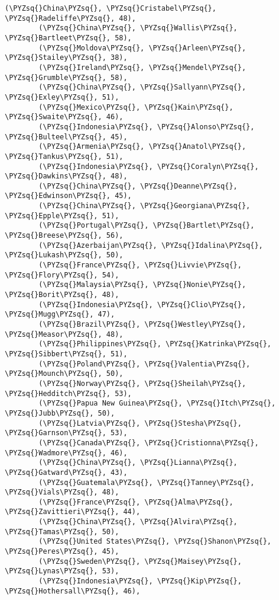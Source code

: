 \documentclass[11pt]{article}
\def\PYZsq{\textquotesingle}%
\def\PYZsq{\char`\'}
\begin{document}
\begin{Verbatim}[commandchars=\\\{\}]
        (\PYZsq{}China\PYZsq{}, \PYZsq{}Cristabel\PYZsq{}, \PYZsq{}Radeliffe\PYZsq{}, 48),
        (\PYZsq{}China\PYZsq{}, \PYZsq{}Wallis\PYZsq{}, \PYZsq{}Bartleet\PYZsq{}, 58),
        (\PYZsq{}Moldova\PYZsq{}, \PYZsq{}Arleen\PYZsq{}, \PYZsq{}Stailey\PYZsq{}, 38),
        (\PYZsq{}Ireland\PYZsq{}, \PYZsq{}Mendel\PYZsq{}, \PYZsq{}Grumble\PYZsq{}, 58),
        (\PYZsq{}China\PYZsq{}, \PYZsq{}Sallyann\PYZsq{}, \PYZsq{}Exley\PYZsq{}, 51),
        (\PYZsq{}Mexico\PYZsq{}, \PYZsq{}Kain\PYZsq{}, \PYZsq{}Swaite\PYZsq{}, 46),
        (\PYZsq{}Indonesia\PYZsq{}, \PYZsq{}Alonso\PYZsq{}, \PYZsq{}Bulteel\PYZsq{}, 45),
        (\PYZsq{}Armenia\PYZsq{}, \PYZsq{}Anatol\PYZsq{}, \PYZsq{}Tankus\PYZsq{}, 51),
        (\PYZsq{}Indonesia\PYZsq{}, \PYZsq{}Coralyn\PYZsq{}, \PYZsq{}Dawkins\PYZsq{}, 48),
        (\PYZsq{}China\PYZsq{}, \PYZsq{}Deanne\PYZsq{}, \PYZsq{}Edwinson\PYZsq{}, 45),
        (\PYZsq{}China\PYZsq{}, \PYZsq{}Georgiana\PYZsq{}, \PYZsq{}Epple\PYZsq{}, 51),
        (\PYZsq{}Portugal\PYZsq{}, \PYZsq{}Bartlet\PYZsq{}, \PYZsq{}Breese\PYZsq{}, 56),
        (\PYZsq{}Azerbaijan\PYZsq{}, \PYZsq{}Idalina\PYZsq{}, \PYZsq{}Lukash\PYZsq{}, 50),
        (\PYZsq{}France\PYZsq{}, \PYZsq{}Livvie\PYZsq{}, \PYZsq{}Flory\PYZsq{}, 54),
        (\PYZsq{}Malaysia\PYZsq{}, \PYZsq{}Nonie\PYZsq{}, \PYZsq{}Borit\PYZsq{}, 48),
        (\PYZsq{}Indonesia\PYZsq{}, \PYZsq{}Clio\PYZsq{}, \PYZsq{}Mugg\PYZsq{}, 47),
        (\PYZsq{}Brazil\PYZsq{}, \PYZsq{}Westley\PYZsq{}, \PYZsq{}Measor\PYZsq{}, 48),
        (\PYZsq{}Philippines\PYZsq{}, \PYZsq{}Katrinka\PYZsq{}, \PYZsq{}Sibbert\PYZsq{}, 51),
        (\PYZsq{}Poland\PYZsq{}, \PYZsq{}Valentia\PYZsq{}, \PYZsq{}Mounch\PYZsq{}, 50),
        (\PYZsq{}Norway\PYZsq{}, \PYZsq{}Sheilah\PYZsq{}, \PYZsq{}Hedditch\PYZsq{}, 53),
        (\PYZsq{}Papua New Guinea\PYZsq{}, \PYZsq{}Itch\PYZsq{}, \PYZsq{}Jubb\PYZsq{}, 50),
        (\PYZsq{}Latvia\PYZsq{}, \PYZsq{}Stesha\PYZsq{}, \PYZsq{}Garnson\PYZsq{}, 53),
        (\PYZsq{}Canada\PYZsq{}, \PYZsq{}Cristionna\PYZsq{}, \PYZsq{}Wadmore\PYZsq{}, 46),
        (\PYZsq{}China\PYZsq{}, \PYZsq{}Lianna\PYZsq{}, \PYZsq{}Gatward\PYZsq{}, 43),
        (\PYZsq{}Guatemala\PYZsq{}, \PYZsq{}Tanney\PYZsq{}, \PYZsq{}Vials\PYZsq{}, 48),
        (\PYZsq{}France\PYZsq{}, \PYZsq{}Alma\PYZsq{}, \PYZsq{}Zavittieri\PYZsq{}, 44),
        (\PYZsq{}China\PYZsq{}, \PYZsq{}Alvira\PYZsq{}, \PYZsq{}Tamas\PYZsq{}, 50),
        (\PYZsq{}United States\PYZsq{}, \PYZsq{}Shanon\PYZsq{}, \PYZsq{}Peres\PYZsq{}, 45),
        (\PYZsq{}Sweden\PYZsq{}, \PYZsq{}Maisey\PYZsq{}, \PYZsq{}Lynas\PYZsq{}, 53),
        (\PYZsq{}Indonesia\PYZsq{}, \PYZsq{}Kip\PYZsq{}, \PYZsq{}Hothersall\PYZsq{}, 46),

\end{Verbatim}
\end{document}
